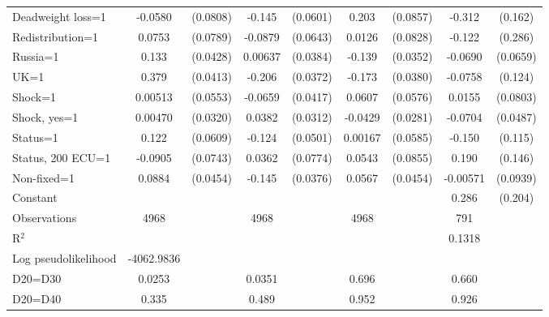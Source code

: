 \begin{tabular}{l|cccccc|cc}
Deadweight loss=1&  -0.0580         & (0.0808)&   -0.145\sym{**} & (0.0601)&    0.203\sym{**} & (0.0857)&   -0.312\sym{*}  &  (0.162)\\
Redistribution=1&   0.0753         & (0.0789)&  -0.0879         & (0.0643)&   0.0126         & (0.0828)&   -0.122         &  (0.286)\\
Russia=1        &    0.133\sym{***}& (0.0428)&  0.00637         & (0.0384)&   -0.139\sym{***}& (0.0352)&  -0.0690         & (0.0659)\\
UK=1            &    0.379\sym{***}& (0.0413)&   -0.206\sym{***}& (0.0372)&   -0.173\sym{***}& (0.0380)&  -0.0758         &  (0.124)\\
Shock=1         &  0.00513         & (0.0553)&  -0.0659         & (0.0417)&   0.0607         & (0.0576)&   0.0155         & (0.0803)\\
Shock, yes=1    &  0.00470         & (0.0320)&   0.0382         & (0.0312)&  -0.0429         & (0.0281)&  -0.0704         & (0.0487)\\
Status=1        &    0.122\sym{**} & (0.0609)&   -0.124\sym{**} & (0.0501)&  0.00167         & (0.0585)&   -0.150         &  (0.115)\\
Status, 200 ECU=1&  -0.0905         & (0.0743)&   0.0362         & (0.0774)&   0.0543         & (0.0855)&    0.190         &  (0.146)\\
Non-fixed=1     &   0.0884\sym{*}  & (0.0454)&   -0.145\sym{***}& (0.0376)&   0.0567         & (0.0454)& -0.00571         & (0.0939)\\
Constant        &                  &         &                  &         &                  &         &    0.286         &  (0.204)\\
\hline
Observations    &     4968         &         &     4968         &         &     4968         &         &      791         &         \\
R$^2$      &                  &         &                  &         &                  &         &        0.1318   &   \\ 
Log pseudolikelihood  &  -4062.9836  &         &                  &         &                  &         &           &   \\ 
D20=D30         &   0.0253         &         &   0.0351         &         &    0.696         &         &    0.660         &         \\
D20=D40         &    0.335         &         &    0.489         &         &    0.952         &         &    0.926         &         \\

\end{tabular}
